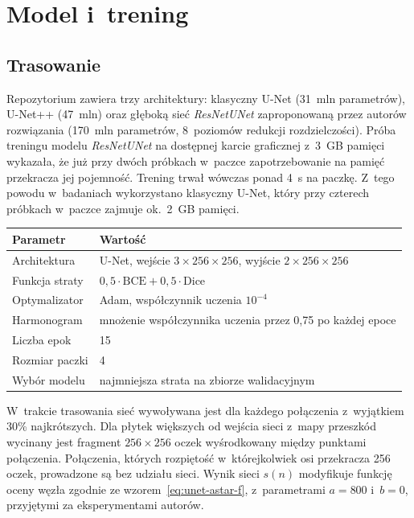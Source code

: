 \section{Model i~trening}
\label{sec:trening}

\subsection{Trasowanie}
\label{sec:trening-trasowanie}

Repozytorium zawiera trzy architektury: klasyczny U-Net (31~mln parametrów),
U-Net++ (47~mln) oraz głęboką sieć \emph{ResNetUNet} zaproponowaną przez
autorów rozwiązania (170~mln parametrów, 8~poziomów redukcji rozdzielczości).
Próba treningu modelu \emph{ResNetUNet} na dostępnej karcie graficznej
z~3~GB pamięci wykazała, że już przy dwóch próbkach w~paczce zapotrzebowanie
na pamięć przekracza jej pojemność. Trening trwał wówczas ponad 4~s na
paczkę. Z~tego powodu w~badaniach wykorzystano klasyczny U-Net, który przy
czterech próbkach w~paczce zajmuje ok.~2~GB pamięci.

\begin{table}[ht]
\label{tab:trening}
\centering\footnotesize%
\begin{tabular}{p{} p{}}
\toprule
Parametr & Wartość \\
\midrule
Architektura & U-Net, wejście $3 \times 256 \times 256$, wyjście
  $2 \times 256 \times 256$ \\
  \midrule
Funkcja straty & $0{,}5 \cdot \mathrm{BCE} + 0{,}5 \cdot \mathrm{Dice}$ \\
\midrule
Optymalizator & Adam, współczynnik uczenia $10^{-4}$ \\
\midrule
Harmonogram & mnożenie współczynnika uczenia przez 0{,}75 po każdej epoce \\
\midrule
Liczba epok & 15 \\
\midrule
Rozmiar paczki & 4 \\
\midrule
Wybór modelu & najmniejsza strata na zbiorze walidacyjnym \\
\bottomrule
\end{tabular}
\end{table}

W~trakcie trasowania sieć wywoływana jest dla każdego połączenia
z~wyjątkiem 30\% najkrótszych. Dla płytek większych od wejścia sieci
z~mapy przeszkód wycinany jest fragment $256 \times 256$ oczek
wyśrodkowany między punktami połączenia. Połączenia, których rozpiętość
w~którejkolwiek osi przekracza 256 oczek, prowadzone są bez udziału sieci.
Wynik sieci $s(n)$ modyfikuje funkcję oceny węzła zgodnie ze
wzorem~\ref{eq:unet-astar-f}, z~parametrami $a = 800$ i~$b = 0$,
przyjętymi za eksperymentami autorów.

